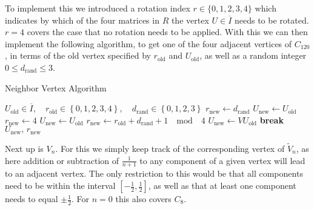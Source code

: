 To implement this we introduced a rotation index $r \in \{0,1,2,3,4\}$ which indicates by which of the four matrices in $R$ the vertex $U \in \overline{I}$ needs to be rotated. $r=4$ covers the case that no rotation needs to be applied. With this we can then implement the following algorithm, to get one of the four adjacent vertices of $C_{120}$, in terms of the old vertex specified by $r_{\textrm{old}}$ and $U_{\textrm{old}}$, as well as a random integer $0 \le d_{\textrm{rand}} \le 3$.
\begin{algorithm}[!htb]
 \caption{Neighbor Vertex Algorithm}
 \label{alg:120CellVertexPick}
 \begin{algorithmic}[1]
  \REQUIRE $U_{\textrm{old}} \in \overline{I}, \quad r_{\textrm{old}}\in \left\{ 0,1,2,3,4\right\}, \quad d_{\textrm{rand}} \in \left\{0,1,2,3 \right\}$
  \STATE $r_{\textrm{new}} \leftarrow d_{\textrm{rand}}$
  \STATE $U_{\textrm{new}} \leftarrow U_{\textrm{old}}$
  \STATE $r_{\textrm{new}} \leftarrow 4$
  \STATE $U_{\textrm{new}} \leftarrow U_{\textrm{old}}$
  \ELSE
  \STATE $r_{\textrm{new}} \leftarrow r_{\textrm{old}} + d_{\textrm{rand}} + 1 \quad \mathrm{mod} \quad 4$
  \STATE $U_{\textrm{new}} \leftarrow V U_{\textrm{old}}$
  \STATE \textbf{break}
  \ENDIF
  \ENDFOR
  \ENDIF
  \RETURN $U_{\textrm{new}}, \, r_{\textrm{new}}$
 \end{algorithmic}
\end{algorithm}

Next up is $V_n$. For this we simply keep track of the corresponding vertex of $\tilde{V}_n$, as here addition or subtraction of $\frac{1}{n+1}$ to any component of a given vertex will lead to an adjacent vertex. The only restriction to this would be that all components need to be within the interval $\left[-\frac{1}{2},\frac{1}{2}\right]$, as well as that at least one component needs to equal $\pm \frac{1}{2}$. For $n = 0$ this also covers $C_8$.\\

